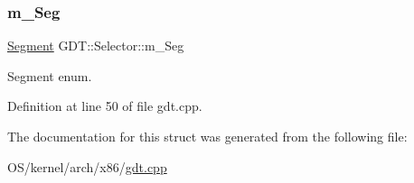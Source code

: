 \subsubsection{\texorpdfstring{m\+\_\+\+Seg}{m\_Seg}}
{\footnotesize\ttfamily \hyperlink{namespace_g_d_t_af2b09941ee46a489ebaccfed5c839154}{Segment} G\+D\+T\+::\+Selector\+::m\+\_\+\+Seg}



Segment enum. 



Definition at line 50 of file gdt.\+cpp.



The documentation for this struct was generated from the following file\+:\begin{DoxyCompactItemize}
\item 
O\+S/kernel/arch/x86/\hyperlink{gdt_8cpp}{gdt.\+cpp}\end{DoxyCompactItemize}
